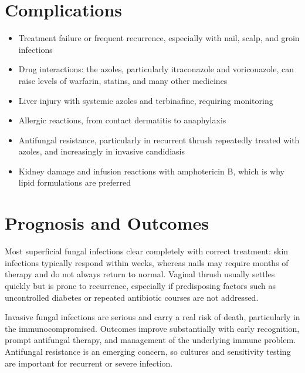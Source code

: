 \section*{Complications}
\begin{itemize}
    \item Treatment failure or frequent recurrence, especially with nail, scalp, and groin infections
    \item Drug interactions: the azoles, particularly itraconazole and voriconazole, can raise levels of warfarin, statins, and many other medicines
    \item Liver injury with systemic azoles and terbinafine, requiring monitoring
    \item Allergic reactions, from contact dermatitis to anaphylaxis
    \item Antifungal resistance, particularly in recurrent thrush repeatedly treated with azoles, and increasingly in invasive candidiasis
    \item Kidney damage and infusion reactions with amphotericin B, which is why lipid formulations are preferred
\end{itemize}

\section*{Prognosis and Outcomes}
Most superficial fungal infections clear completely with correct treatment: skin infections typically respond within weeks, whereas nails may require months of therapy and do not always return to normal. Vaginal thrush usually settles quickly but is prone to recurrence, especially if predisposing factors such as uncontrolled diabetes or repeated antibiotic courses are not addressed.

Invasive fungal infections are serious and carry a real risk of death, particularly in the immunocompromised. Outcomes improve substantially with early recognition, prompt antifungal therapy, and management of the underlying immune problem. Antifungal resistance is an emerging concern, so cultures and sensitivity testing are important for recurrent or severe infection.


